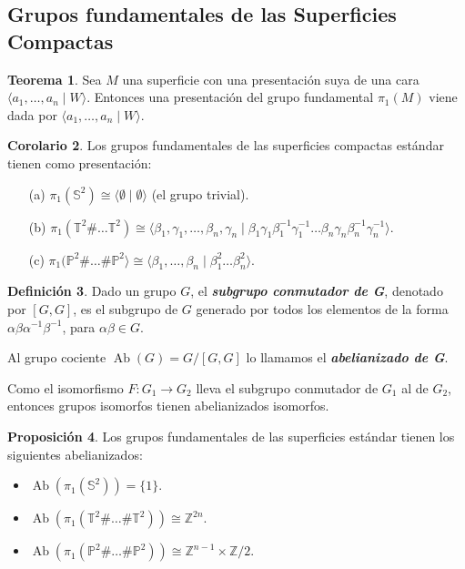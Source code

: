 \documentclass[10pt]{report}
\DeclareMathOperator{\Ab}{Ab}
\newcommand{\Esfera}{\mathbb{S}^2}
\newcommand{\Toro}{\mathbb{T}^2}
\newcommand{\Proyectivo}{\mathbb{P}^2}
\newcommand{\enfatiza}[1]{\textbf{\textit{#1}}}
\theoremstyle{definition}
\newtheorem{defin}{Definición}[section]
\newtheorem{tma}[defin]{Teorema}
\newtheorem{corol}[defin]{Corolario}
\newtheorem{prop}[defin]{Proposición}
\begin{document}
\subsection{Grupos fundamentales de las Superficies Compactas}

\begin{tma}
Sea $M$ una superficie con una presentación suya de una cara $\langle a_1, \dots , a_n \mid W\rangle$. Entonces una presentación del grupo fundamental $\pi_1 (M)$ viene dada por $\langle a_1, \dots , a_n \mid W\rangle$.
\end{tma}

\begin{corol}
Los grupos fundamentales de las superficies compactas estándar tienen como presentación:
\begin{itemize}
\item[(a)] $\pi_1 (\Esfera ) \cong \langle \emptyset \mid \emptyset \rangle $ (el grupo trivial).
\item[(b)] $\pi_1 ( \Toro \# \dots \Toro) \cong \langle \beta_1 , \gamma_1 ,\dots ,\beta_n , \gamma_n \mid \beta_1 \gamma_1 \beta^{-1}_1 \gamma^{-1}_1\dots \beta_n \gamma_n \beta^{-1}_n \gamma^{-1}_n \rangle$.
\item[(c)] $\pi_1(\Proyectivo \# \dots \# \Proyectivo \rangle \cong \langle \beta_1 , \dots , \beta_n \mid \beta_1^{2} \dots \beta_n^{2} \rangle $. 
\end{itemize}
\end{corol}


\begin{defin}
Dado un grupo $G$, el \enfatiza{subgrupo conmutador de G}, denotado por $\left[ G, G \right]$, es el subgrupo de $G$ generado por todos los elementos de la forma $\alpha \beta \alpha^{-1} \beta^{-1}$, para $\alpha \beta \in G$. 

Al grupo cociente $\Ab{(G)} = G / \left[ G,G \right]$ lo llamamos el \enfatiza{abelianizado de G}. 
\end{defin}

Como el isomorfismo $F:G_1 \to G_2$ lleva el subgrupo conmutador de $G_1$ al de $G_2$, entonces grupos isomorfos tienen abelianizados isomorfos. 

\begin{prop}
Los grupos fundamentales de las superficies estándar tienen los siguientes abelianizados:
\begin{itemize}
\item $\Ab{(\pi_1 (\Esfera ))} = \{ 1 \}$.
\item $\Ab{(\pi_1 (\Toro \# \dots \# \Toro ))} \cong \mathbb{Z}^{2n}$.
\item $\Ab{(\pi_1 (\Proyectivo \# \dots \# \Proyectivo ))} \cong \mathbb{Z}^{n-1} \times \mathbb{Z}/2$.
\end{itemize}
\end{prop}
\end{document}
